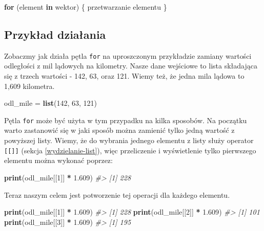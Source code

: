 \documentclass[paper=6in:9in,pagesize=pdftex,headinclude=on,footinclude=on,10pt]{scrbook}
\newenvironment{Shaded}{\begin{snugshade}}{\end{snugshade}}
\newcommand{\CommentTok}[1]{\textcolor[rgb]{0.56,0.35,0.01}{\textit{#1}}}
\newcommand{\ControlFlowTok}[1]{\textcolor[rgb]{0.13,0.29,0.53}{\textbf{#1}}}
\newcommand{\DecValTok}[1]{\textcolor[rgb]{0.00,0.00,0.81}{#1}}
\newcommand{\FloatTok}[1]{\textcolor[rgb]{0.00,0.00,0.81}{#1}}
\newcommand{\KeywordTok}[1]{\textcolor[rgb]{0.13,0.29,0.53}{\textbf{#1}}}
\newcommand{\NormalTok}[1]{#1}
\newcommand{\OperatorTok}[1]{\textcolor[rgb]{0.81,0.36,0.00}{\textbf{#1}}}
\newcommand{\StringTok}[1]{\textcolor[rgb]{0.31,0.60,0.02}{#1}}
\begin{document}
\begin{Shaded}
\begin{Highlighting}[]
\ControlFlowTok{for}\NormalTok{ (element }\ControlFlowTok{in}\NormalTok{ wektor) \{}
\NormalTok{  przetwarzanie elementu}
\NormalTok{\}}
\end{Highlighting}
\end{Shaded}

\hypertarget{for-example}{%
\subsection{Przykład działania}\label{for-example}}

Zobaczmy jak działa pętla \texttt{for} na uproszczonym przykładzie zamiany wartości odległości z mil lądowych na kilometry.
Nasze dane wejściowe to lista składająca się z trzech wartości - 142, 63, oraz 121.
Wiemy też, że jedna mila lądowa to 1,609 kilometra.

\begin{Shaded}
\begin{Highlighting}[]
\NormalTok{odl_mile =}\StringTok{ }\KeywordTok{list}\NormalTok{(}\DecValTok{142}\NormalTok{, }\DecValTok{63}\NormalTok{, }\DecValTok{121}\NormalTok{)}
\end{Highlighting}
\end{Shaded}

Pętla \texttt{for} może być użyta w tym przypadku na kilka sposobów.
Na początku warto zastanowić się w jaki sposób można zamienić tylko jedną wartość z powyższej listy.
Wiemy, że do wybrania jednego elementu z listy służy operator \texttt{{[}{[}{]}{]}} (sekcja \ref{wydzielanie-list}), więc przeliczenie i wyświetlenie tylko pierwszego elementu można wykonać poprzez:

\begin{Shaded}
\begin{Highlighting}[]
\KeywordTok{print}\NormalTok{(odl_mile[[}\DecValTok{1}\NormalTok{]] }\OperatorTok{*}\StringTok{ }\FloatTok{1.609}\NormalTok{)}
\CommentTok{#> [1] 228}
\end{Highlighting}
\end{Shaded}

Teraz naszym celem jest potworzenie tej operacji dla każdego elementu.

\begin{Shaded}
\begin{Highlighting}[]
\KeywordTok{print}\NormalTok{(odl_mile[[}\DecValTok{1}\NormalTok{]] }\OperatorTok{*}\StringTok{ }\FloatTok{1.609}\NormalTok{)}
\CommentTok{#> [1] 228}
\KeywordTok{print}\NormalTok{(odl_mile[[}\DecValTok{2}\NormalTok{]] }\OperatorTok{*}\StringTok{ }\FloatTok{1.609}\NormalTok{)}
\CommentTok{#> [1] 101}
\KeywordTok{print}\NormalTok{(odl_mile[[}\DecValTok{3}\NormalTok{]] }\OperatorTok{*}\StringTok{ }\FloatTok{1.609}\NormalTok{)}
\CommentTok{#> [1] 195}
\end{Highlighting}
\end{Shaded}
\end{document}
